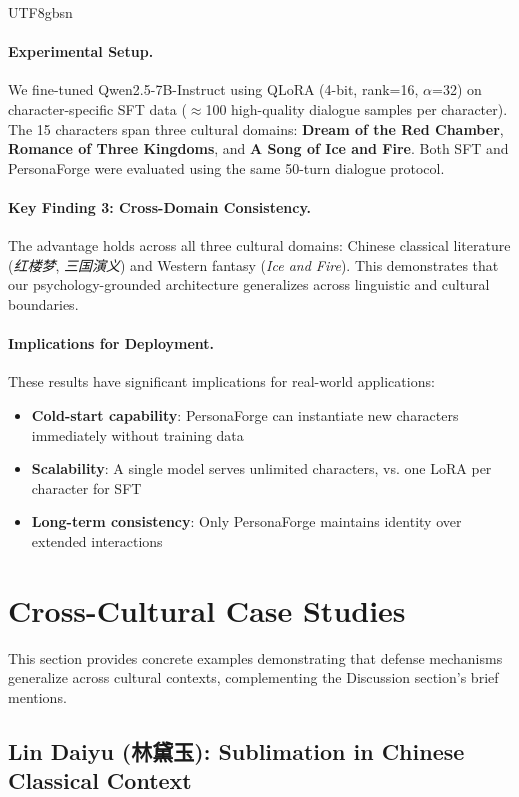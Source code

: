 \documentclass[11pt]{article}
\begin{document}
\begin{CJK*}{UTF8}{gbsn}
\paragraph{Experimental Setup.} We fine-tuned Qwen2.5-7B-Instruct using QLoRA (4-bit, rank=16, $\alpha$=32) on character-specific SFT data ($\approx$100 high-quality dialogue samples per character). The 15 characters span three cultural domains: \textbf{Dream of the Red Chamber}, \textbf{Romance of Three Kingdoms}, and \textbf{A Song of Ice and Fire}. Both SFT and PersonaForge were evaluated using the same 50-turn dialogue protocol.

\paragraph{Key Finding 3: Cross-Domain Consistency.} The advantage holds across all three cultural domains: Chinese classical literature (\textit{红楼梦}, \textit{三国演义}) and Western fantasy (\textit{Ice and Fire}). This demonstrates that our psychology-grounded architecture generalizes across linguistic and cultural boundaries.

\paragraph{Implications for Deployment.} These results have significant implications for real-world applications:
\begin{itemize}
    \item \textbf{Cold-start capability}: PersonaForge can instantiate new characters immediately without training data
    \item \textbf{Scalability}: A single model serves unlimited characters, vs. one LoRA per character for SFT
    \item \textbf{Long-term consistency}: Only PersonaForge maintains identity over extended interactions
\end{itemize}

\section{Cross-Cultural Case Studies}
\label{sec:crosscultural_cases}

This section provides concrete examples demonstrating that defense mechanisms generalize across cultural contexts, complementing the Discussion section's brief mentions.

\subsection{Lin Daiyu (林黛玉): Sublimation in Chinese Classical Context}


\end{CJK*}
\end{document}

